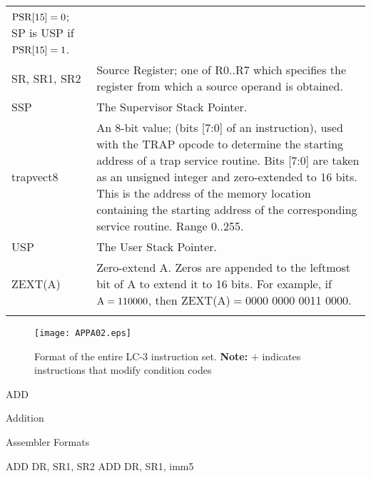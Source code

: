 \documentclass{patt}
\makeatletter
\renewcommand{\apphead}[2]{%
  \clearpage\vspace*{-8pt}
  \noindent\parbox[t]{21pc}{\raggedright\sans\fontsize{24}{28}\fontseries{bk}%
    \selectfont\MakeUppercase{#1}}\parbox[t]{7pc}{\sans\fontseries{bk}\fontsize{14}{28}\selectfont
    \raggedright #2}\@afterindentfalse\@afterheading\vspace*{-1pc}}
\renewcommand{\appbhead}[1]{%
  \goodbreak\vspace{6pt}
  \begingroup
  \noindent\raggedright{\sans\fontsize{12}{14}\fontseries{bk}\selectfont
  #1\par}\endgroup\medskip\@afterindentfalse\@afterheading}
\makeatother
\begin{document}
\begin{table}[t]
{\begin{tabular}{@{\hspace{6pt}}lP{24pc}@{}}
 ${\rm PSR}[15]=0$; SP is USP if ${\rm PSR}[15]=1$.\\
SR, SR1, SR2 & Source Register; one of R0..R7 which specifies the
 register from which a source operand is obtained.\\
SSP & The Supervisor Stack Pointer. \\
trapvect8 & An 8-bit value; (bits [7:0] of an instruction), used
 with the TRAP opcode to determine the starting address of a trap
 service routine. Bits [7:0] are taken as an unsigned integer and
 zero-extended to 16 bits. This is the address of the memory
 location containing the starting address of the corresponding service 
 routine. Range {0..255}.\\
USP & The User Stack Pointer. \\
ZEXT(A) & Zero-extend A. Zeros are appended to the leftmost bit
 of A to extend it to 16 bits. For example, if ${\rm A}=110000$, then
 ZEXT(A)${}={}$0000 0000 0011 0000. \\
\botrule
\end{tabular}}{}
\vspace{-6pt} \label{tab:notation}
\end{table}

\begin{figure}[h]
\centerline{\texttt{[image: APPA02.eps]}} \label{fig:insts}
\caption{Format of the entire LC-3 instruction set. {\bf Note:}
$+$ indicates instructions that modify condition codes}
\end{figure}

\apphead{Add}{\hfill Addition} \label{page:add_inst}

 \vspace{4pt}

\appbhead{Assembler Formats}


\begin{appverbatim}
ADD    DR, SR1, SR2
ADD    DR, SR1, imm5
\end{appverbatim}

\vspace{2pt}
\end{document}
